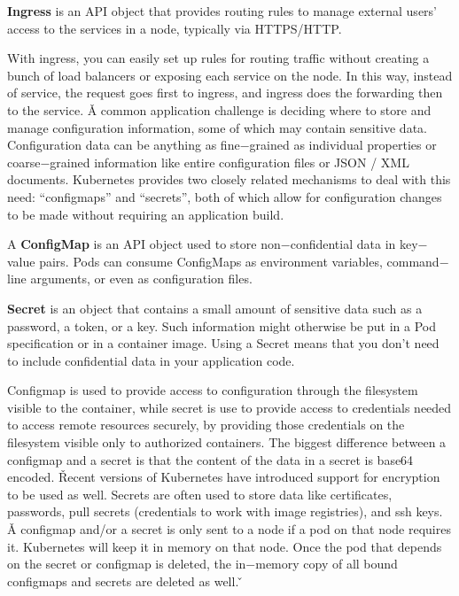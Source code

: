 \bd[Ingress]
\textbf{Ingress} is an API object that provides routing rules to manage external users' access to the services in a
node, typically via HTTPS/HTTP\@.
\ed


With ingress, you can easily set up rules for routing traffic without creating a bunch of load balancers or exposing
each service on the node. In this way, instead of service, the request goes first to ingress, and ingress does the
forwarding then to the service. \v

A common application challenge is deciding where to store and manage configuration information, some of which may
contain sensitive data. Configuration data can be anything as fine$-$grained as individual properties or
coarse$-$grained information like entire configuration files or JSON / XML documents. Kubernetes provides two closely
related mechanisms to deal with this need: ``configmaps'' and ``secrets'', both of which allow for configuration
changes to be made without requiring an application build.

\bd[ConfigMap]
A \textbf{ConfigMap} is an API object used to store non$-$confidential data in key$-$value pairs. Pods can consume
ConfigMaps as environment variables, command$-$line arguments, or even as configuration files.
\ed

\bd[Secret]
\textbf{Secret} is an object that contains a small amount of sensitive data such as a password, a token, or a key. Such
information might otherwise be put in a Pod specification or in a container image. Using a Secret means that you don't
need to include confidential data in your application code.
\ed


Configmap is used to provide access to configuration through the filesystem visible to the container, while secret is
use to provide access to credentials needed to access remote resources securely, by providing those credentials on
the filesystem visible only to authorized containers. The biggest difference between a configmap and a secret is that
the content of the data in a secret is base64 encoded. \v

Recent versions of Kubernetes have introduced support for encryption
to be used as well. Secrets are often used to store data like certificates, passwords, pull secrets (credentials to work
with image registries), and ssh keys. \v

A configmap and/or a secret is only sent to a node if a pod on that node requires it. Kubernetes will keep it in
memory on that node. Once the pod that depends on the secret or configmap is deleted, the in$-$memory copy of all
bound configmaps and secrets are deleted as well. \v

